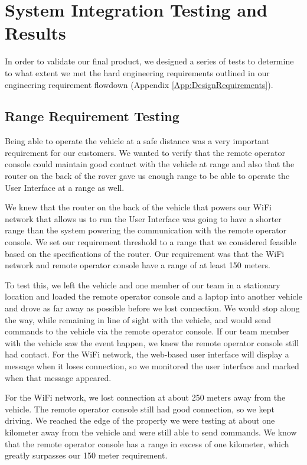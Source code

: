 \chapter{System Integration Testing and Results}

In order to validate our final product, we designed a series of tests to determine to what extent we met the hard engineering requirements outlined in our engineering requirement flowdown (Appendix \ref{App:DesignRequirements}). 

\section{Range Requirement Testing}
Being able to operate the vehicle at a safe distance was a very important requirement for our customers.  We wanted to verify that the remote operator console could maintain good contact with the vehicle at range and also that the router on the back of the rover gave us enough range to be able to operate the User Interface at a range as well.

We knew that the router on the back of the vehicle that powers our WiFi network that allows us to run the User Interface was going to have a shorter range than the system powering the communication with the remote operator console.  We set our requirement threshold to a range that we considered feasible based on the specifications of the router.  Our requirement was that the WiFi network and remote operator console have a range of at least 150 meters.

To test this, we left the vehicle and one member of our team in a stationary location and loaded the remote operator console and a laptop into another vehicle and drove as far away as possible before we lost connection.  We would stop along the way, while remaining in line of sight with the vehicle, and would send commands to the vehicle via the remote operator console.  If our team member with the vehicle saw the event happen, we knew the remote operator console still had contact.  For the WiFi network, the web-based user interface will display a message when it loses connection, so we monitored the user interface and marked when that message appeared.  

For the WiFi network, we lost connection at about 250 meters away from the vehicle.  The remote operator console still had good connection, so we kept driving.  We reached the edge of the property we were testing at about one kilometer away from the vehicle and were still able to send commands.  We know that the remote operator console has a range in excess of one kilometer, which greatly surpasses our 150 meter requirement.

